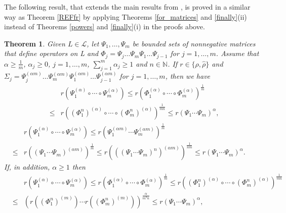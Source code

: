 \documentclass[12pt, reqno]{amsart}
\newtheorem{theorem}{Theorem}[section]
\theoremstyle{definition}
\theoremstyle{remark}
\numberwithin{equation}{section}
\newcommand{\NN}{\mathbb{N}}
\begin{document}

The following result, that extends the main results from \cite{P12}, is proved in  a similar way as Theorem \ref{REFfr} by applying Theorems \ref{for_matrices} and \ref{finally}(ii)  instead of Theorems \ref{powers} and \ref{finally}(i) in the proofs above.
\begin{theorem}
\label{kathyth2}
Given $L\in\mathcal{L}$, let $\Psi _1, \ldots , \Psi _m$ be bounded sets of nonnegative matrices that define operators on L and
 $ \Phi _j=\Psi_j\ldots\Psi_m \Psi_1\ldots\Psi_{j-1}$ for $j=1,\ldots , m$. Assume that
 $\alpha\ge\frac{1}{m}$, $\alpha _j \ge 0$, $j=1, \ldots , m$, $\sum_{j=1}^{m}\alpha_j \ge 1$ and $n \in \NN$. If $r\in \{ \rho, \hat{\rho}\}$ and $ \Sigma _j=\Psi_j ^{(\alpha m)}\ldots\Psi_m ^{(\alpha m)} \Psi_1 ^{(\alpha m)} \ldots\Psi_{j-1} ^{(\alpha m)}$ for $j=1,\ldots , m$, then we have
\begin{eqnarray}
\nonumber
& & r\left(\Psi _1^{(\alpha)}\circ\cdots\circ\Psi _m^{(\alpha)}\right)\le r\left(\Phi _1^{(\alpha)}\circ\cdots\circ\Phi _m^{(\alpha)}\right)^{\frac{1}{m}} \\
&\le& r\left((\Phi _1 ^n)^{(\alpha)}\circ\cdots\circ(\Phi _m ^n)^{(\alpha)}\right)^{\frac{1}{mn}} \le r\left(\Psi_1\cdots\Psi_m\right)^{\alpha},
\label{ineqx}
\end{eqnarray}
\begin{eqnarray}
\nonumber
& & r\left(\Psi _1^{(\alpha)}\circ\cdots\circ\Psi _m^{(\alpha)}\right)\le r\left(\Psi_1^{(\alpha m)}\cdots\Psi_m^{(\alpha m)}\right)^{\frac{1}{m}}\\
&\le&  r\left((\Psi_1\cdots\Psi_m)^{(\alpha m)}\right)^{\frac{1}{m}}\le  r\left(((\Psi_1\cdots\Psi_m)^n)^{(\alpha m)}\right)^{\frac{1}{nm}} \le
r\left(\Psi_1\cdots\Psi_m\right)^{\alpha}. \;\;\;\;\;\;
\label{ineqx2}
\end{eqnarray}
If, in addition, $\alpha \ge 1$ then %
\begin{eqnarray}
\nonumber
& & r\left(\Psi_1^{(\alpha)}\circ\cdots\circ\Psi_m^{(\alpha)}\right)  \le  r\left(\Phi_1^{(\alpha)}\circ\cdots\circ
\Phi_m^{(\alpha)}\right)^{\frac{1}{m}} \le  r\left((\Phi _1 ^n)^{(\alpha)}\circ\cdots\circ(\Phi _m ^n)^{(\alpha)}\right)^{\frac{1}{mn}} \\
&\le &\left( r\left((\Phi_1 ^n)^{(m)}\right)\cdots r\left((\Phi_m ^n)^{(m)}\right)\right)^{\frac{\alpha}{m^2 n}}
 \le r\left(\Psi_1\cdots\Psi_m\right)^{\alpha},
\label{xyz}

\end{eqnarray}
\end{theorem}
\end{document}
